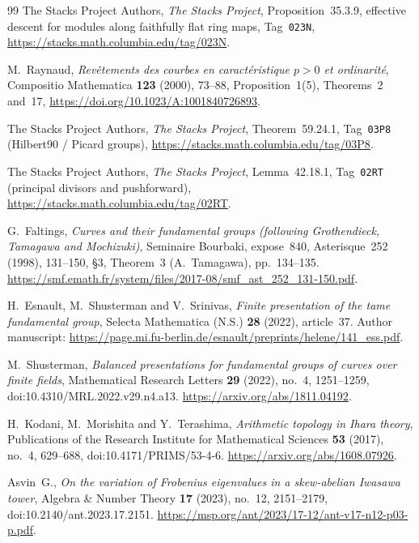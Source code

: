 \begin{thebibliography}{99}
The Stacks Project Authors, \emph{The Stacks Project},
Proposition~35.3.9, effective descent for modules along
faithfully flat ring maps, Tag~\texttt{023N},
\url{https://stacks.math.columbia.edu/tag/023N}.

M.~Raynaud, \emph{Rev\^etements des courbes en caract\'eristique
$p>0$ et ordinarit\'e}, Compositio Mathematica \textbf{123}
(2000), 73--88, Proposition~1(5), Theorems~2 and~17,
\url{https://doi.org/10.1023/A:1001840726893}.

The Stacks Project Authors,
\emph{The Stacks Project}, Theorem~59.24.1,
Tag~\texttt{03P8} (Hilbert90 / Picard groups),
\url{https://stacks.math.columbia.edu/tag/03P8}.

The Stacks Project Authors,
\emph{The Stacks Project}, Lemma~42.18.1,
Tag~\texttt{02RT} (principal divisors and pushforward),
\url{https://stacks.math.columbia.edu/tag/02RT}.

G.~Faltings, \emph{Curves and their fundamental groups
(following Grothendieck, Tamagawa and Mochizuki)},
Seminaire Bourbaki, expose~840, Asterisque~252 (1998), 131--150,
\S3, Theorem~3 (A.~Tamagawa), pp.~134--135.
\url{https://smf.emath.fr/system/files/2017-08/smf_ast_252_131-150.pdf}.

H.~Esnault, M.~Shusterman and V.~Srinivas,
\emph{Finite presentation of the tame fundamental group},
Selecta Mathematica (N.S.) \textbf{28} (2022), article~37.
Author manuscript:
\url{https://page.mi.fu-berlin.de/esnault/preprints/helene/141_ess.pdf}.

M.~Shusterman,
\emph{Balanced presentations for fundamental groups of curves over finite fields},
Mathematical Research Letters \textbf{29} (2022), no.~4, 1251--1259,
doi:10.4310/MRL.2022.v29.n4.a13.
\url{https://arxiv.org/abs/1811.04192}.

H.~Kodani, M.~Morishita and Y.~Terashima,
\emph{Arithmetic topology in Ihara theory},
Publications of the Research Institute for Mathematical Sciences
\textbf{53} (2017), no.~4, 629--688,
doi:10.4171/PRIMS/53-4-6.
\url{https://arxiv.org/abs/1608.07926}.

Asvin~G.,
\emph{On the variation of Frobenius eigenvalues in a skew-abelian Iwasawa tower},
Algebra \& Number Theory \textbf{17} (2023), no.~12, 2151--2179,
doi:10.2140/ant.2023.17.2151.
\url{https://msp.org/ant/2023/17-12/ant-v17-n12-p03-p.pdf}.


\end{thebibliography}
